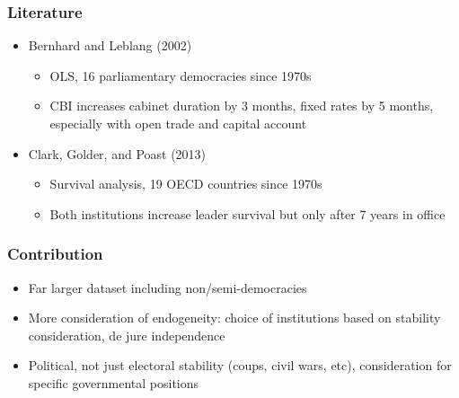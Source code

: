 \documentclass{beamer}
\begin{document}
    \begin{frame}
        \frametitle{Literature}
        \begin{itemize}
            \item Bernhard and Leblang (2002)
            \begin{itemize}
                \item OLS, 16 parliamentary democracies since 1970s
                \item CBI increases cabinet duration by 3 months, fixed rates by 5 months, especially with open trade and capital account
            \end{itemize}
            \item Clark, Golder, and Poast (2013)
            \begin{itemize}
                \item Survival analysis, 19 OECD countries since 1970s
                \item Both institutions increase leader survival but only after 7 years in office
            \end{itemize}
        \end{itemize}
    \end{frame}

    \begin{frame}
        \frametitle{Contribution}
        \begin{itemize}
            \item Far larger dataset including non/semi-democracies
            \item More consideration of endogeneity: choice of institutions based on stability consideration, de jure independence
            \item Political, not just electoral stability (coups, civil wars, etc), consideration for specific governmental positions
        \end{itemize}
    \end{frame}
\end{document}
